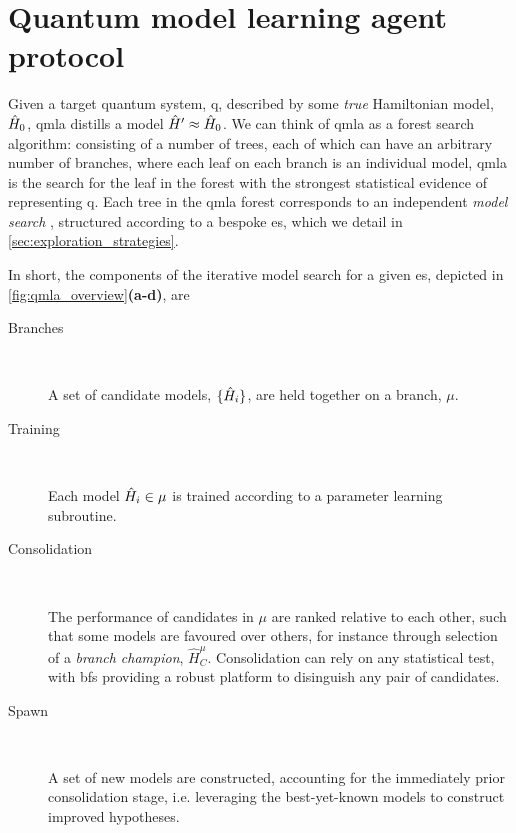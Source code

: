 \section{Quantum model learning agent protocol}\label{sec:qmla_protocol}
Given a target quantum system, \gls{q}, described by some \emph{true} Hamiltonian model, $\hat{H}_0$, 
    \gls{qmla} distills a model $\hat{H}^{\prime} \approx \hat{H}_0$.
We can think of \gls{qmla} as a forest search algorithm\footnotemark:
    consisting of a number of trees, each of which can have an arbitrary number of branches, 
    where each leaf on each branch is an individual model, 
    \gls{qmla} is the search for the leaf in the forest with the 
    strongest statistical evidence of representing \gls{q}. 
Each tree in the \gls{qmla} forest corresponds to an independent \emph{ \gls{model search} }, 
    structured according to a bespoke \gls{es}, which we detail in \cref{sec:exploration_strategies}. 
\par 
In short, the components of the iterative \gls{model search} for a given \gls{es}, 
    depicted in \cref{fig:qmla_overview}\textbf{(a-d)}, are
\begin{description}
    \item[Branches] \ 
    
    A set of candidate models, $\{ \hat{H}_i \}$, are held together on a branch, $\mu$. 
    
    \item[Training] \ 
    
    Each model $\hat{H}_i \in \mu$ is trained according to a parameter learning subroutine.
    
    \item[Consolidation] \ 
    
    The performance of candidates in $\mu$ are ranked relative to each other, 
        such that some models are favoured over others, for instance through selection of a \emph{branch champion}, $\hat{H}_C^{\mu}$. 
        Consolidation can rely on any statistical test, with \glspl{bf} providing a robust platform to disinguish 
        any pair of candidates.
    
    \item[Spawn] \  
    
    A set of new models are constructed, accounting for the immediately prior consolidation stage, 
        i.e. leveraging the best-yet-known models to construct improved hypotheses.
\end{description}

